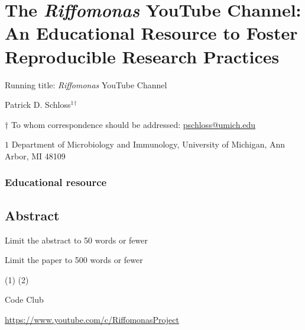 \documentclass[
]{article}
\author{}
\date{\vspace{-2.5em}}
\begin{document}
\vspace*{10mm}

\hypertarget{the-riffomonas-youtube-channel-an-educational-resource-to-foster-reproducible-research-practices}{%
\section{\texorpdfstring{The \emph{Riffomonas} YouTube Channel: An
Educational Resource to Foster Reproducible Research
Practices}{The Riffomonas YouTube Channel: An Educational Resource to Foster Reproducible Research Practices}}\label{the-riffomonas-youtube-channel-an-educational-resource-to-foster-reproducible-research-practices}}

\vspace{15mm}

Running title: \emph{Riffomonas} YouTube Channel

\vspace{15mm}

Patrick D. Schloss\({^1}\)\({^\dagger}\)

\vspace{40mm}

\(\dagger\) To whom correspondence should be addressed:
\href{mailto:pschloss@umich.edu}{pschloss@umich.edu}

\(1\) Department of Microbiology and Immunology, University of Michigan,
Ann Arbor, MI 48109

\vspace{35mm}

\hypertarget{educational-resource}{%
\subsubsection{Educational resource}\label{educational-resource}}

\newpage
\linenumbers

\hypertarget{abstract}{%
\subsection{Abstract}\label{abstract}}

Limit the abstract to 50 words or fewer

\newpage

Limit the paper to 500 words or fewer

(1) (2)

Code Club

\url{https://www.youtube.com/c/RiffomonasProject}
\end{document}
